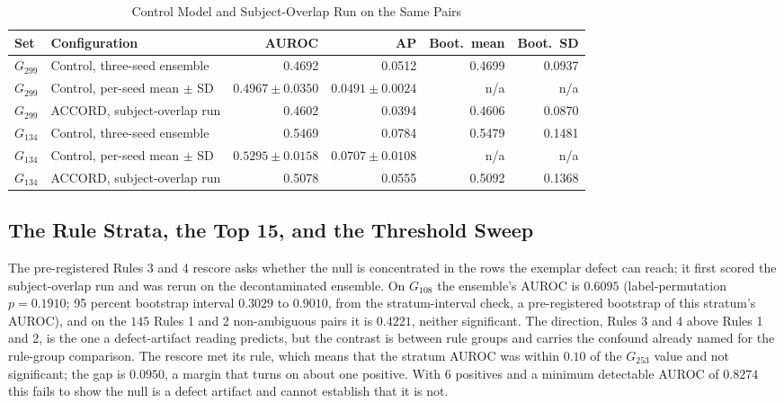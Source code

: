 \begin{table}[H]
\caption{Control Model and Subject-Overlap Run on the Same Pairs}
\centering
\footnotesize
\begin{tabular}{@{}llrrrr@{}}
\toprule
\textbf{Set} & \textbf{Configuration} & \textbf{AUROC} & \textbf{AP} &
\textbf{Boot.\ mean} & \textbf{Boot.\ SD} \\
\midrule
$G_{299}$ & Control, three-seed ensemble & 0.4692 & 0.0512 & 0.4699 & 0.0937 \\
$G_{299}$ & Control, per-seed mean $\pm$ SD & $0.4967 \pm 0.0350$ & $0.0491 \pm 0.0024$ & n/a & n/a \\
$G_{299}$ & ACCORD, subject-overlap run & 0.4602 & 0.0394 & 0.4606 & 0.0870 \\
\midrule
$G_{134}$ & Control, three-seed ensemble & 0.5469 & 0.0784 & 0.5479 & 0.1481 \\
$G_{134}$ & Control, per-seed mean $\pm$ SD & $0.5295 \pm 0.0158$ & $0.0707 \pm 0.0108$ & n/a & n/a \\
$G_{134}$ & ACCORD, subject-overlap run & 0.5078 & 0.0555 & 0.5092 & 0.1368 \\
\bottomrule
\end{tabular}
\label{tab:control299}
\end{table}

\subsection{The Rule Strata, the Top 15, and the Threshold Sweep}

The pre-registered Rules 3 and 4 rescore asks whether the null is concentrated in the
rows the exemplar defect can reach; it first scored the subject-overlap run and was rerun on the decontaminated ensemble. On $G_{108}$ the ensemble's AUROC is $0.6095$
(label-permutation $p = 0.1910$; 95 percent bootstrap interval $0.3029$ to
$0.9010$, from the stratum-interval check, a pre-registered bootstrap of this stratum's AUROC), and on the $145$ Rules 1 and 2 non-ambiguous pairs it is $0.4221$, neither significant.
The direction, Rules 3 and 4 above Rules 1 and 2, is the one a defect-artifact
reading predicts, but the contrast is between rule groups and carries the
confound already named for the rule-group comparison. The rescore met its rule, which means that the stratum AUROC was within
$0.10$ of the $G_{253}$ value and not significant; the gap is $0.0950$, a
margin that turns on about one positive. With 6 positives and a minimum
detectable AUROC of $0.8274$ this fails to show the null is a defect
artifact and cannot establish that it is not.

